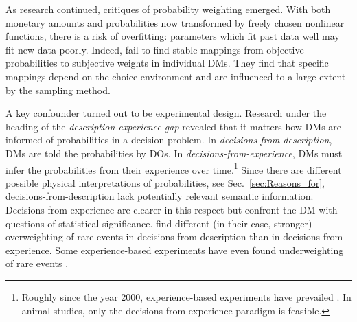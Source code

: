 \documentclass[a4paper, 12pt]{article}
\newcommand{\seclabel}[1]{\label{sec:#1}}
\newcommand{\secref}[1]{Sec.~\ref{sec:#1}}
\begin{document}
As research continued, critiques of probability weighting emerged. With both monetary amounts and probabilities now transformed by freely chosen nonlinear functions, there is a risk of overfitting: parameters which fit past data well may fit new data poorly. Indeed, \textcite{StewartETAL2015} fail to find stable mappings from objective probabilities to subjective weights in individual DMs. They find that specific mappings depend on the choice environment and are influenced to a large extent by the sampling method.

A key confounder turned out to be experimental design. Research under the heading of the \textit{description-experience gap} revealed that it matters how DMs are informed of probabilities in a decision problem. In \textit{decisions-from-description}, DMs are told the probabilities by DOs. In \textit{decisions-from-experience}, DMs must infer the probabilities from their experience over time.\footnote{Roughly since the year 2000, experience-based experiments have prevailed \parencite{HertwigETAL2004,HertwigErev2009,ErevETAL2010}. In animal studies, only the decisions-from-experience paradigm is feasible.} Since there are different possible physical interpretations of probabilities, see \secref{Reasons_for}, decisions-from-description lack potentially relevant semantic information. Decisions-from-experience are clearer in this respect but confront the DM with questions of statistical significance. \textcite{HertwigETAL2004} find different (in their case, stronger) overweighting of rare events in decisions-from-description than in decisions-from-experience. Some experience-based experiments have even found underweighting of rare events \parencites{UngemachETAL2009}[see esp. Tab. 9]{WulffETAL2018}.
\end{document}
